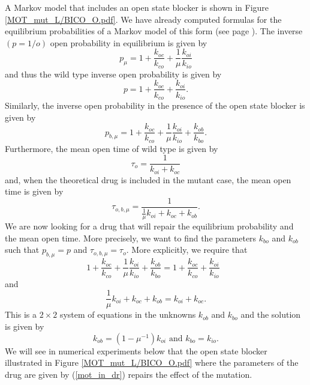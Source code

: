 A Markov model that includes an open state blocker is shown in 
Figure \ref{MOT_mut_L/BICO_O.pdf}.
We have already computed
formulas for the equilibrium probabilities of a Markov model of this form (see
page \pageref{Ionchannels_L/BICO.pdf}). The inverse $(p=1/o)$ open probability in equilibrium is given by
\[
p_{\mu}=1+\frac{k_{oc}}{k_{co}}+\frac{1}{\mu}\frac{k_{oi}}{k_{io}}%
\]
and thus the wild type inverse open probability is given by%
\[
p=1+\frac{k_{oc}}{k_{co}}+\frac{k_{oi}}{k_{io}}.
\]
Similarly, the inverse open probability in the presence of the open state blocker 
is given by%
\[
p_{b,\mu}=1+\frac{k_{oc}}{k_{co}}+\frac{1}{\mu}\frac{k_{oi}}{k_{io}}+\frac{k_{ob}%
}{k_{bo}}.
\]
Furthermore, the mean open time of wild type is given by%
\[
\tau_{o}=\frac{1}{k_{oi}+k_{oc}}%
\]
and, when the theoretical drug is included in the mutant case, the mean open
time is given by%
\[
\tau_{o,b,\mu}=\frac{1}{\frac{1}{\mu}k_{oi}+k_{oc}+k_{ob}}.
\]
We are now looking for a drug that will repair the equilibrium probability and
the mean open time. More precisely, we want to find the parameters $k_{bo}$
and $k_{ob}$ such that $p_{b,\mu}=p$ and $\tau_{o,b,\mu}=\tau_{o}$. More explicitly, we require that
\[
1+\frac{k_{oc}}{k_{co}}+\frac{1}{\mu}\frac{k_{oi}}{k_{io}}+\frac{k_{ob}%
}{k_{bo}}=1+\frac{k_{oc}}{k_{co}}+\frac{k_{oi}}{k_{io}}\text{ }%
\]
and%
\[
\frac{1}{\mu}k_{oi}+k_{oc}+k_{ob}=k_{oi}+k_{oc}.
\]
This is a $2\times 2$ system of equations in the unknowns $k_{ob}$ and $k_{bo}$ and the 
solution is given by
\begin{equation}
k_{ob}=\left(  1-\mu^{-1}\right)  k_{oi}\text{ and }k_{bo}=k_{io}.\label{mot_in_dr}%
\end{equation}
We will see in numerical experiments below that the open state blocker
illustrated in Figure  \ref{MOT_mut_L/BICO_O.pdf} where the parameters of the drug are given by (\ref{mot_in_dr})
repairs the effect of the mutation.

